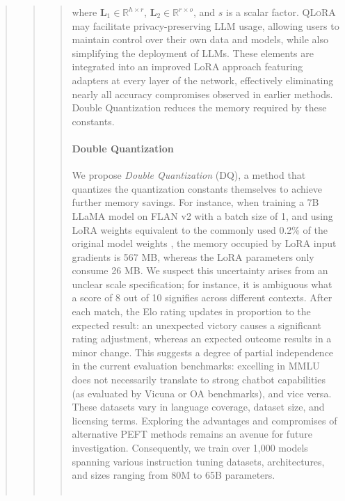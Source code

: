 \begin{quote}
\begin{abstract}
{{\begin{quote}
where $\mathbf{L}_1\in  \mathbb{R}^{h\times r}$, $\mathbf{L}_2\in  \mathbb{R}^{r\times o}$, and $s$ is a scalar factor. \textsc{QLoRA} may facilitate privacy-preserving LLM usage, allowing users to maintain control over their own data and models, while also simplifying the deployment of LLMs. These elements are integrated into an improved LoRA approach featuring adapters at every layer of the network, effectively eliminating nearly all accuracy compromises observed in earlier methods. Double Quantization reduces the memory required by these constants. \paragraph{Double Quantization{}} 
We propose \emph{Double Quantization} (DQ), a method that quantizes the quantization constants themselves to achieve further memory savings.  For instance, when training a 7B LLaMA model on FLAN v2 with a batch size of 1, and using LoRA weights equivalent to the commonly used 0.2\% of the original model weights \citep{hu2021lora,liu2022few}, the memory occupied by LoRA input gradients is 567 MB, whereas the LoRA parameters only consume 26 MB. We suspect this uncertainty arises from an unclear scale specification; for instance, it is ambiguous what a score of 8 out of 10 signifies across different contexts. After each match, the Elo rating updates in proportion to the expected result: an unexpected victory causes a significant rating adjustment, whereas an expected outcome results in a minor change. This suggests a degree of partial independence in the current evaluation benchmarks: excelling in MMLU does not necessarily translate to strong chatbot capabilities (as evaluated by Vicuna or OA benchmarks), and vice versa. These datasets vary in language coverage, dataset size, and licensing terms. Exploring the advantages and compromises of alternative PEFT methods remains an avenue for future investigation. Consequently, we train over 1,000 models spanning various instruction tuning datasets, architectures, and sizes ranging from 80M to 65B parameters. \\ \\

\end{quote}}}
\end{abstract}
\end{quote}
